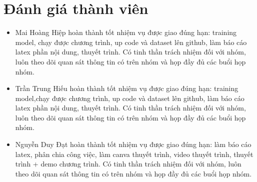 \chapter*{Đánh giá thành viên}
\label{danhgiathanhvien}
\begin{itemize}
    \item Mai Hoàng Hiệp hoàn thành tốt nhiệm vụ được giao đúng hạn: training model, chạy được chương trình, up code và dataset lên github, làm báo cáo latex phần nội dung, thuyết trình. Có tinh thần trách nhiệm đối với nhóm, luôn theo dõi quan sát thông tin có trên nhóm và họp đầy đủ các buổi họp nhóm.
    \item Trần Trung Hiếu hoàn thành tốt nhiệm vụ được giao đúng hạn: training model,chạy được chương trình, up code và dataset lên github, làm báo cáo latex phần nội dung, thuyết trình. Có tinh thần trách nhiệm đối với nhóm, luôn theo dõi quan sát thông tin có trên nhóm và họp đầy đủ các buổi họp nhóm.
    \item Nguyễn Duy Đạt hoàn thành tốt nhiệm vụ được giao đúng hạn: làm báo cáo latex, phân chia công việc, làm canva thuyết trình, video thuyết trình, thuyết trình + demo chương trình. Có tinh thần trách nhiệm đối với nhóm, luôn theo dõi quan sát thông tin có trên nhóm và họp đầy đủ các buổi họp nhóm.
\end{itemize}
